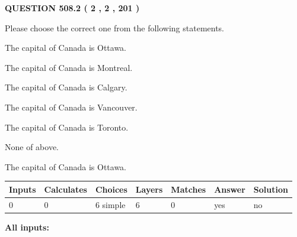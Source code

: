 \documentclass[12pt]{article}
\begin{document}
   
  
\vspace{0.2in}
  
{\textbf{\Large{QUESTION
508.2 
 ( 2 , 2 , 201 )
}}}
  
  
Please choose the correct one from the following statements.
 
 
The capital of Canada is Ottawa.
 
 
The capital of Canada is Montreal.
 
 
The capital of Canada is Calgary.
 
 
The capital of Canada is Vancouver.
 
 
The capital of Canada is Toronto.
 
 
 None of above.
 
 
\noindent{}
 
 
The capital of Canada is Ottawa.
 
 
\noindent{}
 
 
   
   
   
   
\noindent\begin{tabular}{|l|l|l|l|l|l|l|}
 \hline
Inputs & Calculates & Choices & Layers & Matches & Answer & Solution \\ \hline
 0  & 
 0  & 
 6
  simple  
  & 
 6  & 
 0  & 
  yes & 
  no 
  \\ \hline
 \end{tabular}
   
   
   
   
\noindent{}
   
   
   
   
\noindent\vspace{0.1in}\hspace{-0.08in} {\textbf{\Large{All inputs: }}}
   
   
   
   
   
   
 \vspace{0.2in}
 
   
   
\end{document}

